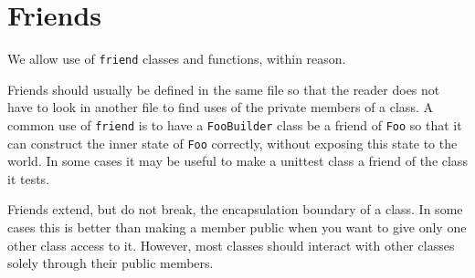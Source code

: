 
\section{Friends}\label{sec:friends}
We allow use of \texttt{friend} classes and functions, within reason.

Friends should usually be defined in the same file so that the reader does not have to look in another file to find uses of the private members of a class. A common use of \texttt{friend} is to have a \texttt{FooBuilder} class be a friend of \texttt{Foo} so that it can construct the inner state of \texttt{Foo} correctly, without exposing this state to the world. In some cases it may be useful to make a unittest class a friend of the class it tests.

Friends extend, but do not break, the encapsulation boundary of a class. In some cases this is better than making a member public when you want to give only one other class access to it. However, most classes should interact with other classes solely through their public members.
